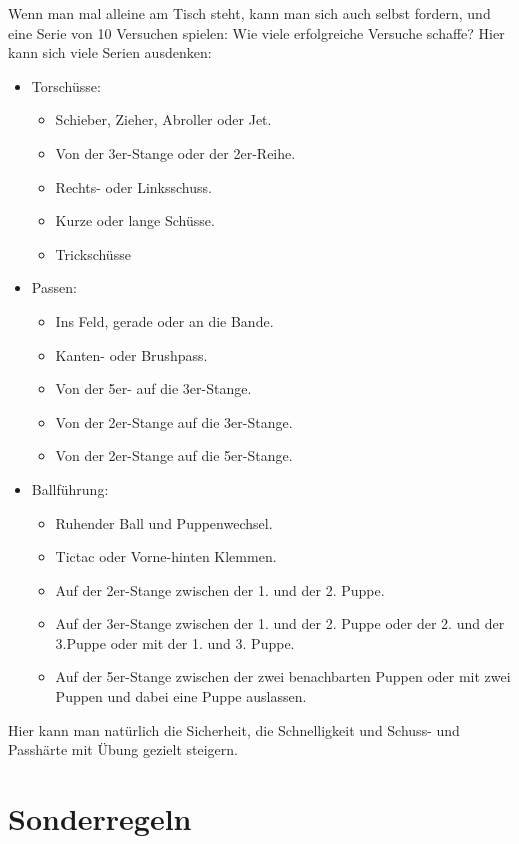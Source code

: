 Wenn man mal alleine am Tisch steht, kann man sich auch selbst fordern, und eine Serie von 10 Versuchen spielen: Wie viele erfolgreiche Versuche schaffe?
Hier kann sich viele Serien ausdenken:
\begin{itemize}
\item Torschüsse: 
\begin{itemize}
\item Schieber, Zieher, Abroller oder Jet.
\item Von der 3er-Stange oder der 2er-Reihe.
\item Rechts- oder Linksschuss.
\item Kurze oder lange Schüsse.
\item Trickschüsse
\end{itemize}
\item Passen:
\begin{itemize}
\item Ins Feld, gerade oder an die Bande.
\item Kanten- oder Brushpass.
\item Von der 5er- auf die 3er-Stange.
\item Von der 2er-Stange auf die 3er-Stange.
\item Von der 2er-Stange auf die 5er-Stange.
\end{itemize}
\item Ballführung: 
\begin{itemize}
\item Ruhender Ball und Puppenwechsel.
\item Tictac oder Vorne-hinten Klemmen.
\item Auf der 2er-Stange zwischen der 1. und der 2. Puppe.
\item Auf der 3er-Stange zwischen der 1. und der 2. Puppe oder der 2. und der 3.Puppe oder mit der 1. und 3. Puppe.
\item Auf der 5er-Stange zwischen der zwei benachbarten Puppen oder mit zwei Puppen und dabei eine Puppe auslassen.
\end{itemize}
\end{itemize}
Hier kann man natürlich die Sicherheit, die Schnelligkeit und Schuss- und Passhärte mit Übung gezielt steigern.


\section{Sonderregeln}
\label{spielformen:sonderregeln}

